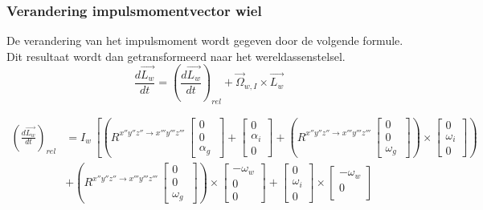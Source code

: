 \subsubsection{Verandering impulsmomentvector wiel}
De verandering van het impulsmoment wordt gegeven door de volgende formule. Dit resultaat wordt dan getransformeerd naar het wereldassenstelsel.
\begin{equation}
\frac{d\overrightarrow{L_{w}}}{dt} = \left(\frac{d\overrightarrow{L_{w}}}{dt}\right)_{rel}+\overrightarrow{\Omega}_{w,I}\times\overrightarrow{L_{w}}
\end{equation}

\begin{align*}
\left(\frac{d\overrightarrow{L_{w}}}{dt}\right)_{rel}&=I_{w}\,\left[\left(R^{x''y''z'' \rightarrow x'''y'''z'''}\,\begin{bmatrix}
0\\
0\\
\alpha_{g}\
\end{bmatrix}
+\begin{bmatrix}
0\\
\alpha_{i}\\
0\
\end{bmatrix}
+\left(R^{x''y''z'' \rightarrow x'''y'''z'''}\,\begin{bmatrix}
0\\
0\\
\omega_{g}\
\end{bmatrix}
\right)\times\begin{bmatrix}
0\\
\omega_{i}\\
0\
\end{bmatrix}
\right)\right.\\
&\left.+\left(R^{x''y''z'' \rightarrow x'''y'''z'''}\,\begin{bmatrix}
0\\
0\\
\omega_{g}\
\end{bmatrix}\right)\times\begin{bmatrix}
-\omega_{w}\\
0\\
0\
\end{bmatrix}+\begin{bmatrix}
0\\
\omega_{i}\\
0\
\end{bmatrix}\times\begin{bmatrix}
-\omega_{w}\\
0\\

\end{bmatrix}
\end{align*}
